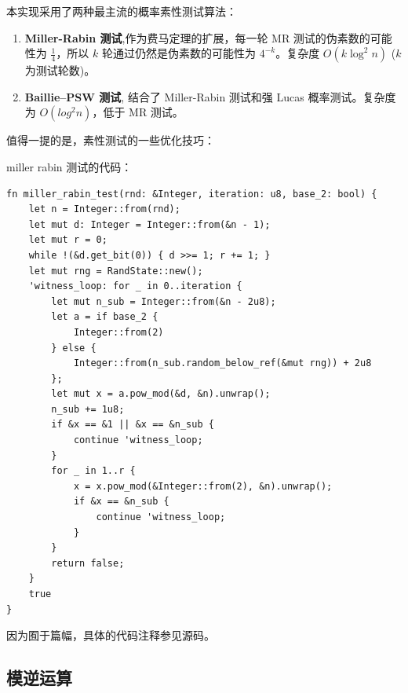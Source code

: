 \documentclass[degree=project,degree-type=project,cjk-font=noto]{thuthesis}
\newcommand*\justify{%
  \fontdimen2\font=0.4em%
  \fontdimen3\font=0.2em%
  \fontdimen4\font=0.1em%
  \fontdimen7\font=0.1em%
  \hyphenchar\font=`\-%
}
\renewcommand{\texttt}[1]{%
  \begingroup
  \ttfamily
  \begingroup\lccode`~=`/\lowercase{\endgroup\def~}{/\discretionary{}{}{}}%
  \begingroup\lccode`~=`[\lowercase{\endgroup\def~}{[\discretionary{}{}{}}%
  \begingroup\lccode`~=`.\lowercase{\endgroup\def~}{.\discretionary{}{}{}}%
  \catcode`/=\active\catcode`[=\active\catcode`.=\active
  \justify\scantokens{#1\noexpand}%
  \endgroup
}
\begin{document}
本实现采用了两种最主流的概率素性测试算法：

\begin{enumerate}
  \item \textbf{Miller-Rabin 测试},作为费马定理的扩展，每一轮 MR 测试的伪素数的可能性为 $\frac{1}{4}$，所以 $k$ 轮通过仍然是伪素数的可能性为 $4^{-k}$。复杂度 $O(k \log^2 n)$ ($k$ 为测试轮数)。
  \item \textbf{Baillie–PSW 测试}, 结合了 Miller-Rabin 测试和强 Lucas 概率测试。复杂度为 $O(log^2 n)$，低于 MR 测试。
\end{enumerate}

值得一提的是，素性测试的一些优化技巧：


miller rabin 测试的代码：

\begin{verbatim}
fn miller_rabin_test(rnd: &Integer, iteration: u8, base_2: bool) {
    let n = Integer::from(rnd);
    let mut d: Integer = Integer::from(&n - 1);
    let mut r = 0;
    while !(&d.get_bit(0)) { d >>= 1; r += 1; }
    let mut rng = RandState::new();
    'witness_loop: for _ in 0..iteration {
        let mut n_sub = Integer::from(&n - 2u8);
        let a = if base_2 {
            Integer::from(2)
        } else {
            Integer::from(n_sub.random_below_ref(&mut rng)) + 2u8
        };
        let mut x = a.pow_mod(&d, &n).unwrap();
        n_sub += 1u8;
        if &x == &1 || &x == &n_sub {
            continue 'witness_loop;
        }
        for _ in 1..r {
            x = x.pow_mod(&Integer::from(2), &n).unwrap();
            if &x == &n_sub {
                continue 'witness_loop;
            }
        }
        return false;
    }
    true
}
\end{verbatim}

因为囿于篇幅，具体的代码注释参见源码。

\subsection{模逆运算}
\end{document}
